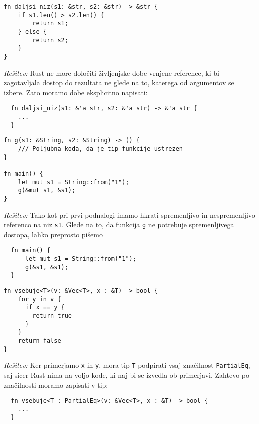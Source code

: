 \documentclass[arhiv]{../izpit}
\begin{document}
\podnaloga
\begin{verbatim}
fn daljsi_niz(s1: &str, s2: &str) -> &str {
    if s1.len() > s2.len() {
        return s1;
    } else {
        return s2;
    }
}
\end{verbatim}

\noindent
\emph{Rešitev:} Rust ne more določiti življenjske dobe vrnjene reference, ki bi zagotavljala dostop do rezultata ne glede na to, katerega od argumentov se izbere. Zato moramo dobe eksplicitno napisati:
%
\begin{verbatim}
  fn daljsi_niz(s1: &'a str, s2: &'a str) -> &'a str {
    ...
  }
\end{verbatim}

\podnaloga

\begin{verbatim}
fn g(s1: &String, s2: &String) -> () {
    /// Poljubna koda, da je tip funkcije ustrezen
}

fn main() {
    let mut s1 = String::from("1");
    g(&mut s1, &s1);
}
\end{verbatim}

\noindent
\emph{Rešitev:} Tako kot pri prvi podnalogi imamo hkrati spremenljivo in nespremenljivo referenco na niz \texttt{s1}. Glede na to, da funkcija \texttt{g} ne potrebuje spremenljivega dostopa, lahko preprosto pišemo
\begin{verbatim}
  fn main() {
      let mut s1 = String::from("1");
      g(&s1, &s1);
  }
  \end{verbatim}

\podnaloga

\begin{verbatim}
fn vsebuje<T>(v: &Vec<T>, x : &T) -> bool {
    for y in v {
      if x == y {
        return true
      }
    }
    return false
}
\end{verbatim}

\noindent
\emph{Rešitev:} Ker primerjamo \texttt{x} in \texttt{y}, mora tip \texttt{T} podpirati vsaj značilnost \texttt{PartialEq}, saj sicer Rust nima na voljo kode, ki naj bi se izvedla ob primerjavi. Zahtevo po značilnosti moramo zapisati v tip:
\begin{verbatim}
  fn vsebuje<T : PartialEq>(v: &Vec<T>, x : &T) -> bool {
    ...
  }
\end{verbatim}
\end{document}
